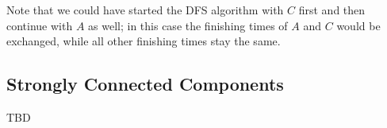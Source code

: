 Note that we could have started the DFS algorithm with $C$ first and then continue with $A$ as well; in this case the finishing times of $A$ and $C$ would be exchanged, while all other finishing times stay the same. 




\subsection{Strongly Connected Components}

TBD


